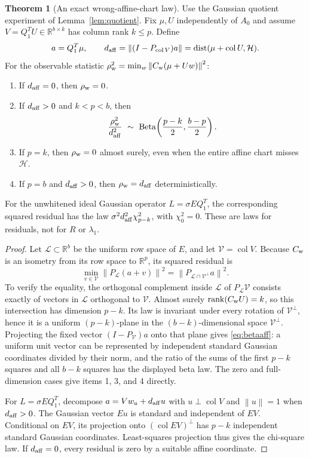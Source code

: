 \documentclass[11pt,a4paper]{article}
\theoremstyle{definition}
\newtheorem{theorem}{Theorem}[section]
\theoremstyle{definition}
\theoremstyle{remark}\newtheorem{remark}[theorem]{Remark}
\newcommand{\R}{\mathbb R}\newcommand{\Prob}{\mathbb P}\newcommand{\E}{\mathbb E}
\newcommand{\HH}{\mathcal H}\newcommand{\XX}{\mathcal X}\newcommand{\col}{\operatorname{col}}
\newcommand{\norm}[1]{\left\lVert #1\right\rVert}
\newcommand{\proj}[1]{P_{#1}}
\begin{document}
\begin{theorem}[An exact wrong-affine-chart law]\label{thm:wrong}
Use the Gaussian quotient experiment of Lemma~\ref{lem:quotient}. Fix $\mu,U$ independently of $A_0$ and assume $V=Q_1^TU\in\R^{b\times k}$ has column rank $k\le p$. Define
\[
a=Q_1^T\mu,\qquad d_{\rm aff}=\norm{(I-\proj{\col V})a}
=\dist(\mu+\col U,\HH).
\]
For the observable statistic $\rho_{\rm w}^2=\min_w\norm{C_{\rm w}(\mu+Uw)}^2$:
\begin{enumerate}
\item If $d_{\rm aff}=0$, then $\rho_{\rm w}=0$.
\item If $d_{\rm aff}>0$ and $k<p<b$, then
\begin{equation}\label{eq:betaaff}
\frac{\rho_{\rm w}^2}{d_{\rm aff}^2}\ \sim\
\operatorname{Beta}\!\left(\frac{p-k}{2},\frac{b-p}{2}\right).
\end{equation}
\item If $p=k$, then $\rho_{\rm w}=0$ almost surely, even when the entire affine chart misses $\HH$.
\item If $p=b$ and $d_{\rm aff}>0$, then $\rho_{\rm w}=d_{\rm aff}$ deterministically.
\end{enumerate}
For the unwhitened ideal Gaussian operator $L=\sigma E Q_1^T$, the corresponding squared residual has the law $\sigma^2d_{\rm aff}^2\chi^2_{p-k}$, with $\chi^2_0=0$. These are laws for residuals, not for $R$ or $\lambda_1$.
\end{theorem}
\begin{proof}
Let $\mathcal L\subset\R^b$ be the uniform row space of $E$, and let $\mathcal V=\col V$. Because $C_{\rm w}$ is an isometry from its row space to $\R^p$, its squared residual is
\[
\min_{v\in\mathcal V}\norm{\proj{\mathcal L}(a+v)}^2
=\norm{\proj{\mathcal L\cap\mathcal V^\perp}a}^2.
\]
To verify the equality, the orthogonal complement inside $\mathcal L$ of $\proj{\mathcal L}\mathcal V$ consists exactly of vectors in $\mathcal L$ orthogonal to $\mathcal V$. Almost surely $\operatorname{rank}(C_{\rm w}U)=k$, so this intersection has dimension $p-k$. Its law is invariant under every rotation of $\mathcal V^\perp$, hence it is a uniform $(p-k)$-plane in the $(b-k)$-dimensional space $\mathcal V^\perp$. Projecting the fixed vector $(I-\proj{\mathcal V})a$ onto that plane gives \eqref{eq:betaaff}: a uniform unit vector can be represented by independent standard Gaussian coordinates divided by their norm, and the ratio of the sums of the first $p-k$ squares and all $b-k$ squares has the displayed beta law. The zero and full-dimension cases give items 1, 3, and 4 directly.

For $L=\sigma EQ_1^T$, decompose $a=Vw_a+d_{\rm aff}u$ with $u\perp\col V$ and $\norm u=1$ when $d_{\rm aff}>0$. The Gaussian vector $Eu$ is standard and independent of $EV$. Conditional on $EV$, its projection onto $(\col EV)^\perp$ has $p-k$ independent standard Gaussian coordinates. Least-squares projection thus gives the chi-square law. If $d_{\rm aff}=0$, every residual is zero by a suitable affine coordinate.
\end{proof}
\end{document}
